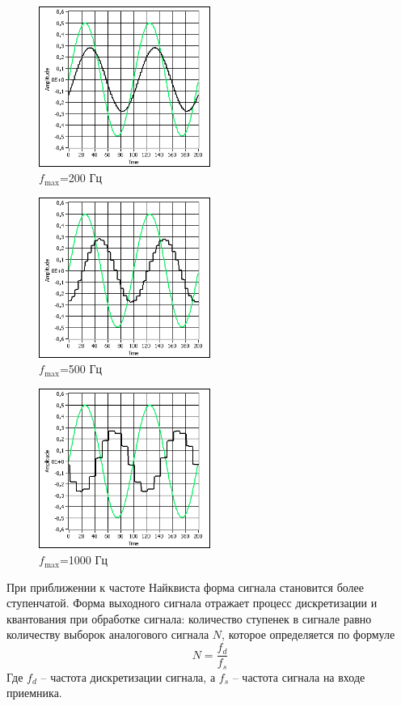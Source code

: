 \begin{figure}[H]
  \centering
  \includegraphics[width=0.5\textwidth]{data/Z4_FN4/signal_200.png}
  \caption{$f_{\max}$=200 Гц}
  \label{fig:}
\end{figure}
\begin{figure}[H]
  \centering
  \includegraphics[width=0.5\textwidth]{data/Z4_FN4/signal_500.png}
  \caption{$f_{\max}$=500 Гц}
  \label{fig:}
\end{figure}
\begin{figure}[H]
  \centering
  \includegraphics[width=0.5\textwidth]{data/Z4_FN4/signal_1000.png}
  \caption{$f_{\max}$=1000 Гц}
  \label{fig:}
\end{figure}

При приближении к частоте Найквиста форма сигнала становится более ступенчатой. Форма выходного сигнала отражает процесс дискретизации и квантования при обработке сигнала: количество ступенек в сигнале равно количеству выборок аналогового сигнала $N$, которое определяется по формуле
\begin{equation}
  N=\frac{f_d}{f_s}
\end{equation}
Где $f_d$ -- частота дискретизации сигнала, а $f_s$ -- частота сигнала на входе приемника.


